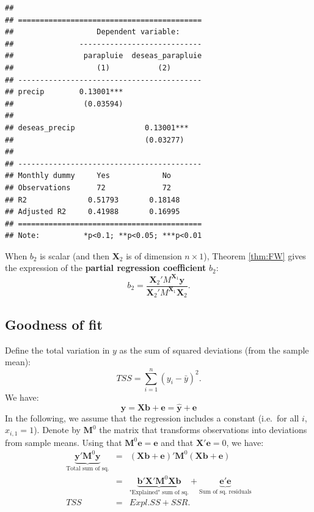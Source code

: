 \documentclass[
  12pt,
]{book}
\theoremstyle{definition}
\theoremstyle{definition}
\theoremstyle{definition}
\theoremstyle{definition}
\theoremstyle{remark}
\begin{document}
\begin{verbatim}
## 
## ==========================================
##                   Dependent variable:     
##               ----------------------------
##                parapluie  deseas_parapluie
##                   (1)           (2)       
## ------------------------------------------
## precip        0.13001***                  
##                (0.03594)                  
##                                           
## deseas_precip                0.13001***   
##                              (0.03277)    
##                                           
## ------------------------------------------
## Monthly dummy     Yes            No       
## Observations      72             72       
## R2              0.51793       0.18148     
## Adjusted R2     0.41988       0.16995     
## ==========================================
## Note:          *p<0.1; **p<0.05; ***p<0.01
\end{verbatim}

When \(b_2\) is scalar (and then \(\mathbf{X}_2\) is of dimension \(n \times 1\)), Theorem \ref{thm:FW} gives the expression of the \textbf{partial regression coefficient} \(b_2\):
\[
b_2 = \frac{\mathbf{X}_2'M^{\mathbf{X}_1}\mathbf{y}}{\mathbf{X}_2'M^{\mathbf{X}_1}\mathbf{X}_2}.
\]

\hypertarget{goodness-of-fit}{%
\subsection{Goodness of fit}\label{goodness-of-fit}}

Define the total variation in \(y\) as the sum of squared deviations (from the sample mean):
\[
TSS = \sum_{i=1}^{n} (y_i - \bar{y})^2.
\]
We have:
\[
\mathbf{y} = \mathbf{X}\mathbf{b} + \mathbf{e} = \hat{\mathbf{y}} + \mathbf{e}
\]
In the following, we assume that the regression includes a constant (i.e.~for all \(i\), \(x_{i,1}=1\)). Denote by \(\mathbf{M}^0\) the matrix that transforms observations into deviations from sample means. Using that \(\mathbf{M}^0 \mathbf{e} = \mathbf{e}\) and that \(\mathbf{X}' \mathbf{e}=0\), we have:
\begin{eqnarray*}
\underbrace{\mathbf{y}'\mathbf{M}^0\mathbf{y}}_{\mbox{Total sum of sq.}} &=& (\mathbf{X}\mathbf{b} + \mathbf{e})' \mathbf{M}^0 (\mathbf{X}\mathbf{b} + \mathbf{e})\\
&=& \underbrace{\mathbf{b}' \mathbf{X}' \mathbf{M}^0 \mathbf{X}\mathbf{b}}_{\mbox{"Explained" sum of sq.}} + \underbrace{\mathbf{e}'\mathbf{e}}_{\mbox{Sum of sq. residuals}}\\
TSS &=& Expl.SS + SSR.
\end{eqnarray*}
\end{document}
